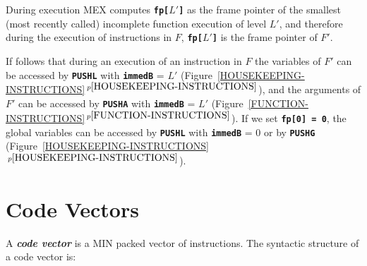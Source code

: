 \documentclass[12pt]{article}
\newcommand{\TT}[1]{{\tt \bfseries #1}}
\newcommand{\key}[1]{{\bf \em #1}\index{#1}}
\newcommand{\itemref}[1]{\ref{#1}$\,^{p\pageref{#1}}$}
\begin{document}
During execution MEX computes \TT{fp[$L'$]} as the frame pointer
of the smallest (most recently called)
incomplete function execution of level $L'$,
and therefore
during the execution of instructions in $F$, \TT{fp[$L'$]} is the
frame pointer of $F'$.

If follows that during an execution of an instruction in $F$
the variables of $F'$ can be accessed by
\TT{PUSHL} with \TT{immedB} = $L'$ (Figure~\itemref{HOUSEKEEPING-INSTRUCTIONS}),
and the arguments of $F'$ can be
accessed by \TT{PUSHA} with \TT{immedB} = $L'$
(Figure~\itemref{FUNCTION-INSTRUCTIONS}).
If we set \TT{fp[0] = 0},
the global variables can be accessed by \TT{PUSHL} with \TT{immedB} = $0$
or by \TT{PUSHG}
(Figure~\itemref{HOUSEKEEPING-INSTRUCTIONS}).

\section{Code Vectors}
\label{CODE-VECTORS}

A \key{code vector} is a MIN packed vector of instructions.
The syntactic structure of a code vector is:
\end{document}
